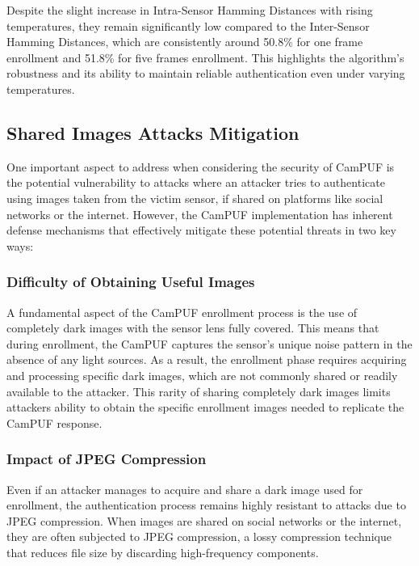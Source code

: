 Despite the slight increase in Intra-Sensor Hamming Distances with rising temperatures, they remain significantly low compared to the Inter-Sensor Hamming Distances, which are consistently around 50.8\% for one frame enrollment and 51.8\% for five frames enrollment. This highlights the algorithm's robustness and its ability to maintain reliable authentication even under varying temperatures.

\subsection{Shared Images Attacks Mitigation}\label{sec:attacks}

One important aspect to address when considering the security of CamPUF is the potential vulnerability to attacks where an attacker tries to authenticate using images taken from the victim sensor, if shared on platforms like social networks or the internet. However, the CamPUF implementation has inherent defense mechanisms that effectively mitigate these potential threats in two key ways:

\subsubsection{Difficulty of Obtaining Useful Images}

A fundamental aspect of the CamPUF enrollment process is the use of completely dark images with the sensor lens fully covered. This means that during enrollment, the CamPUF captures the sensor's unique noise pattern in the absence of any light sources. As a result, the enrollment phase requires acquiring and processing specific dark images, which are not commonly shared or readily available to the attacker. This rarity of sharing completely dark images limits attackers ability to obtain the specific enrollment images needed to replicate the CamPUF response.

\subsubsection{Impact of JPEG Compression}

Even if an attacker manages to acquire and share a dark image used for enrollment, the authentication process remains highly resistant to attacks due to JPEG compression. When images are shared on social networks or the internet, they are often subjected to JPEG compression, a lossy compression technique that reduces file size by discarding high-frequency components.

